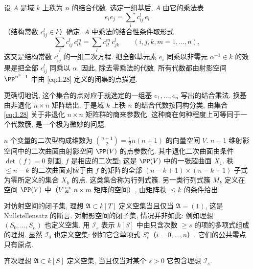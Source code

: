 \begin{example}[结合代数的簇]\label{exam:assoc-algebras}
	设 $A$ 是域 $k$ 上秩为 $n$ 的结合代数. 选定一组基后, $A$ 由它的乘法表
	\[
		e_i e_j = \sum_l c_{ij}^l\, e_l
	\]
	（结构常数 $c_{ij}^l \in k$）确定. $A$ 中乘法的结合性条件取形式
	\begin{equation}
		\label{eq:1.28}
		\sum_l c_{ij}^l\, c_{lk}^m = \sum_l c_{il}^m\, c_{jk}^l \qquad (i, j, k, m = 1, \ldots, n),
	\end{equation}
	这又是结构常数 $c_{ij}^l$ 的一组二次方程. 把全部基元素 $e_i$ 同乘以非零元 $\alpha^{-1} \in k$ 的效果是把全部 $c_{ij}^l$ 同乘以 $\alpha$. 因此, 除去零乘法的代数, 所有代数都由射影空间 $\PP^{n^3-1}$ 中由 \eqref{eq:1.28} 定义的闭集的点描述.

	更确切地说, 这个集合的点对应于就选定的一组基 $e_1, \ldots, e_n$ 写出的结合乘法. 换基由非退化 $n \times n$ 矩阵给出. 于是域 $k$ 上秩 $n$ 的结合代数按同构分类, 由集合 \eqref{eq:1.28} 关于非退化 $n \times n$ 矩阵群的商来参数化. 这种商在何种程度上可等同于一个代数簇, 是一个极为微妙的问题.
\end{example}

\begin{example}[行列式簇]\label{exam:determinantal}
	$n$ 个变量的二次型构成维数为 $\binom{n+1}{2} = \tfrac{1}{2} n(n+1)$ 的向量空间 $V$. $n-1$ 维射影空间中的二次曲面由射影空间 $\PP(V)$ 的点参数化. 其中退化二次曲面由条件 $\det(f) = 0$ 刻画, $f$ 是相应的二次型; 这是 $\PP(V)$ 中的一张超曲面 $X_1$. 秩 $\le n-k$ 的二次曲面对应于由 $f$ 的矩阵的全部 $(n-k+1) \times (n-k+1)$ 子式为零所定义的集合 $X_k$ 的点. 这类集合称为行列式簇. 另一类行列式簇 $M_k$ 定义在空间 $\PP(V)$ 中（$V$ 是 $n \times m$ 矩阵的空间）, 由矩阵秩 $\le k$ 的条件给出.
\end{example}

对仿射空间的闭子集, 理想 $\mathfrak A \subset k[T]$ 定义空集当且仅当 $\mathfrak A = (1)$, 这是 Nullstellensatz 的断言. 对射影空间的闭子集, 情况并非如此: 例如理想 $(S_0, \ldots, S_n)$ 也定义空集. 用 $\mathcal I_s$ 表示 $k[S]$ 中由只含次数 $\ge s$ 的项的多项式组成的理想. 显然 $\mathcal I_s$ 也定义空集: 例如它含单项式 $S_i^s$（$i = 0, \ldots, n$）, 它们的公共零点只有原点.

\begin{lemma}\label{lem:proj-empty}
	齐次理想 $\mathfrak A \subset k[S]$ 定义空集, 当且仅当对某个 $s > 0$ 它包含理想 $\mathcal I_s$.
\end{lemma}

